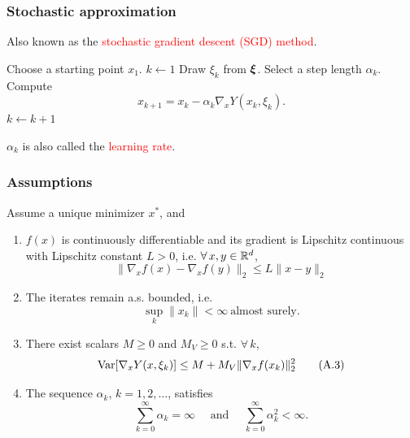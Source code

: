 \documentclass[usepdftitle=false, aspectratio=169]{beamer}
\begin{document}
\begin{frame}
\frametitle{Stochastic approximation}

Also known as the \textcolor{red}{stochastic gradient descent (SGD) method}.

\mbox{}

\begin{algorithmic}
\State Choose a starting point $x_1$.
\State $k \leftarrow 1$
\State Draw $\xi_k$ from ${\boldsymbol{\xi}}$.
\State Select a step length $\alpha_k$.
\State Compute
$$
x_{k+1} = x_k - \alpha_k \nabla_x Y(x_k, \xi_k).
$$
\State $k \leftarrow k+1$
\EndWhile
\end{algorithmic}

\mbox{}

$\alpha_k$ is also called the \textcolor{red}{learning rate}.

\end{frame}

\begin{frame}
\frametitle{Assumptions}


Assume a unique minimizer $x^*$, and
\begin{enumerate}
\item[A.1]
$f(x)$ is continuously differentiable and its gradient is Lipschitz continuous with Lipschitz constant $L > 0$, i.e. $\forall\, x, y \in {\mathbb{R}}^d$,
\begin{equation}
\| \nabla_x f(x) - \nabla_x f(y) \|_2 \leq L \| x - y \|_2
\tag{A.1}
\label{ass:Lipschitz}
\end{equation}
\item[A.2]
The iterates remain a.s. bounded, i.e.
\begin{equation}
\sup_k \| x_k \| < \infty\ \text{almost surely}.
\tag{A.2}
\label{ass:bounds}
\end{equation}
\item[A.3]
There exist scalars $M \geq 0$ and $M_V \geq 0$ s.t. $\forall\, k$,
\begin{equation}
\operatorname{Var}[\nabla_x Y(x, \xi_k)] \leq M + M_V\| \nabla_x f(x_k)\|_2^2
\tag{A.3}
\label{ass:var}
\end{equation}
\item[A.4]
The sequence $\alpha_k$, $k=1,2,\ldots$, satisfies
\begin{equation}
\sum_{k=0}^{\infty}\alpha_k=\infty \quad \mbox{ and } \quad \sum_{k=0}^{\infty}\alpha_k^{2} < \infty.
\tag{A.4}
\label{ass:steps}
\end{equation}
\end{enumerate}

\end{frame}
\end{document}
